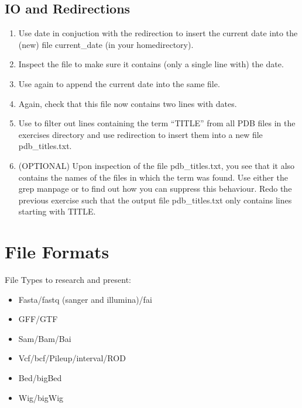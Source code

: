 \documentclass[letterpaper,10pt,english]{sphinxmanual}
\begin{document}
\section{IO and Redirections}
\label{exercises_beginner:io-and-redirections}\begin{enumerate}
\item {} 
Use date in conjuction with the redirection to insert the current date into the (new) file current\_date (in your homedirectory).

\item {} 
Inspect the file to make sure it contains (only a single line with) the date.

\item {} 
Use  again to append the current date into the same file.

\item {} 
Again, check that this file now contains two lines with dates.

\item {} 
Use  to filter out lines containing the term ``TITLE'' from all PDB files in the exercises directory and use redirection to insert them into a new file pdb\_titles.txt.

\item {} 
(OPTIONAL) Upon inspection of the file pdb\_titles.txt, you see that it also contains the names of the files in which the term was found.
Use either the grep manpage or  to find out how you can suppress this behaviour.
Redo the previous exercise such that the output file pdb\_titles.txt only contains lines starting with TITLE.

\end{enumerate}


\chapter{File Formats}
\label{known_file_formats:file-formats}\label{known_file_formats::doc}
File Types to research and present:
\begin{itemize}
\item {} 
Fasta/fastq (sanger and illumina)/fai

\item {} 
GFF/GTF

\item {} 
Sam/Bam/Bai

\item {} 
Vcf/bcf/Pileup/interval/ROD

\item {} 
Bed/bigBed

\item {} 
Wig/bigWig

\end{itemize}
\end{document}
